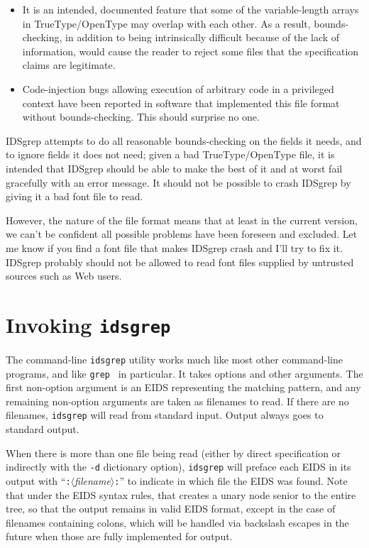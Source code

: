\documentclass[twocolumn]{report}
\begin{document}
\begin{itemize}
  \item It is an intended, documented feature that some of the
    variable-length arrays in TrueType/OpenType may overlap with each other. 
    As a result, bounds-checking, in addition to being intrinsically
    difficult because of the lack of information, would cause the
    reader to reject some files that the specification claims are
    legitimate.
  \item Code-injection bugs allowing execution of arbitrary
    code in a privileged context have been reported in software
    that implemented this file format without bounds-checking.  This should
    surprise no one.
\end{itemize}

IDSgrep attempts to do all reasonable bounds-checking on the fields it
needs, and to ignore fields it does not need; given a bad TrueType/OpenType
file, it is intended that IDSgrep should be able to make the best of it and
at worst fail gracefully with an error message.  It should not be possible
to crash IDSgrep by giving it a bad font file to read.

However, the nature of the file format means that at least in the
current version, we can't be confident all possible problems have
been foreseen and excluded.  Let me know if you find a font file that
makes IDSgrep crash and I'll try to fix it. IDSgrep probably should not be
allowed to read font files supplied by untrusted sources such as Web
users.


\chapter{Invoking \texttt{idsgrep}}

The command-line \texttt{idsgrep} utility works much like most other
command-line programs, and like \texttt{grep}~\cite{grep} in particular.  It
takes options and other arguments.  The first non-option argument is an EIDS
representing the matching pattern, and any remaining non-option arguments
are taken as filenames to read.  If there are no filenames, \texttt{idsgrep}
will read from standard input.  Output always goes to standard output.

When there is more than one file being read (either by direct specification
or indirectly with the \texttt{-d} dictionary option), \texttt{idsgrep} will
preface each EIDS in its output with
``\texttt{:}$\langle$\textit{filename}$\rangle$\texttt{:}'' to indicate
in which file the EIDS was found.  Note that under the EIDS syntax rules,
that creates a unary node senior to the entire tree, so that the output
remains in valid EIDS format, except in the case of filenames containing
colons, which will be handled via backslash escapes in the future when those
are fully implemented for output.
\end{document}
